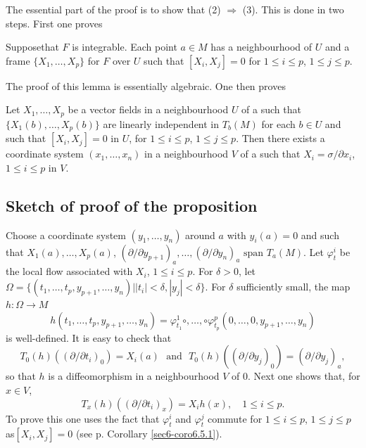 The essential part of the proof is to show that (2) $\Rightarrow$ (3). This is done in two steps. First one proves

\begin{lemma}\label{sec8-lem8.3}
Suppose\pageoriginale that $F$ is integrable. Each point $a\in M$ has a neighbourhood of $U$ and a frame $\{X_{1},\ldots,X_{p}\}$ for $F$ over $U$ such that $[X_{i},X_{j}]=0$ for $1\leq i\leq p$, $1\leq j\leq p$.
\end{lemma}

The proof of this lemma is essentially algebraic. One then proves

\begin{proposition}\label{sec8-prop8.4}
Let $X_{1},\ldots,X_{p}$ be a vector fields in a neighbourhood $U$ of a such that $\{X_{1}(b),\ldots,X_{p}(b)\}$ are linearly independent in $T_{b}(M)$ for each $b\in U$ and such that $[X_{i},X_{j}]=0$ in $U$, for $1\leq i\leq p$, $1\leq j\leq p$. Then there exists a coordinate system $(x_{1},\ldots,x_{n})$ in a neighbourhood $V$ of a such that $X_{i}=\sigma/\partial x_{i}$, $1\leq i\leq p$ in $V$.
\end{proposition}

\subsection*{Sketch of proof of the proposition}

Choose a coordinate system $(y_{1},\ldots,y_{n})$ around $a$ with $y_{i}(a)=0$ and such that $X_{1}(a),\ldots,X_{p}(a)$, $(\partial/\partial y_{p+1})_{a},\ldots,(\partial/\partial y_{n})_{a}\text{~span~} T_{a}(M)$. Let $\varphi^{i}_{t}$ be the local flow associated with $X_{i}$, $1\leq i\leq p$. For $\delta>0$, let $\Omega=\{(t_{1},\ldots,t_{p},y_{p+1},\ldots,y_{n})\big| |t_{i}|<\delta,|y_{j}|<\delta\}$. For $\delta$ sufficiently small, the map $h:\Omega\to M$
$$
h(t_{1},\ldots,t_{p},y_{p+1},\ldots,y_{n})=\varphi^{1}_{t_{1}}\circ,\ldots,\circ\varphi^{p}_{t_{p}}(0,\ldots,0,y_{p+1},\ldots,y_{n})
$$
is well-defined. It is easy to check that
$$
T_{0}(h)\left((\partial/\partial t_{i})_{0}\right)=X_{i}(a)\text{~ and~ } T_{0}(h)\left((\partial/\partial y_{j})_{0}\right)=(\partial/\partial y_{j})_{a},
$$
so that $h$ is a diffeomorphism in a neighbourhood $V$ of $0$. Next one shows that, for $x\in V$,
$$
T_{x}(h)\left((\partial/\partial t_{i})_{x}\right)=X_{i}h(x),\quad 1\leq i\leq p.
$$
To prove this one uses the fact that $\varphi^{i}_{t}$ and $\varphi^{j}_{t}$ commute for $1\leq i\leq p$, $1\leq j\leq p$ as\pageoriginale $[X_{i},X_{j}]=0$ (see p.\pageref{page26} Corollary \ref{sec6-coro6.5.1}).

